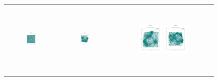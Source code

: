 \begin{figure}[p]
\begin{tabular}{ccc}
         \includegraphics[height=36mm,width=0.24\textwidth]{Images/simulation_no_obs/straight_paths/31.png}
        & \includegraphics[height=36mm,width=0.24\textwidth]{Images/simulation_no_obs/straight_paths/32.png}
        & \includegraphics[height=36mm,width=0.24\textwidth]{Images/simulation_no_obs/straight_paths/33.png}
         \includegraphics[height=36mm,width=0.24\textwidth]{Images/simulation_no_obs/straight_paths/34.png}\\[-4pt]



\end{tabular}
\end{figure}
